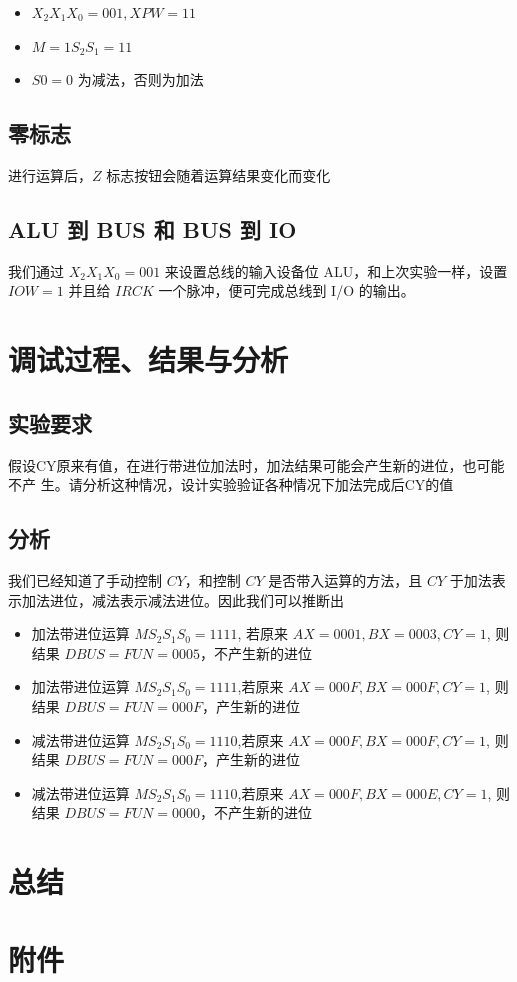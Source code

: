 \documentclass[a4paper,10pt,UTF8]{paper}
\numberwithin{equation}{section}
\numberwithin{figure}{section}
\begin{document}
\begin{itemize}
  \item $X_2X_1X_0=001,XPW=11$
  \item $M=1 S_2S_1=11$
  \item $S0=0$ 为减法，否则为加法
\end{itemize}


\subsection{零标志}

进行运算后，$Z$ 标志按钮会随着运算结果变化而变化

\subsection{ ALU 到 BUS 和 BUS 到 IO}


我们通过 $X_2X_1X_0 = 001$ 来设置总线的输入设备位 ALU，和上次实验一样，设置 $IOW = 1$ 并且给 $IRCK$ 一个脉冲，便可完成总线到 I/O 的输出。


\section{调试过程、结果与分析}

\subsection{实验要求}

假设CY原来有值，在进行带进位加法时，加法结果可能会产生新的进位，也可能不产 生。请分析这种情况，设计实验验证各种情况下加法完成后CY的值

\subsection{分析}

我们已经知道了手动控制 $CY$，和控制 $CY$ 是否带入运算的方法，且 $CY$ 于加法表示加法进位，减法表示减法进位。因此我们可以推断出

\begin{itemize}
  \item 加法带进位运算 $MS_2S_1S_0=1111$, 若原来 $AX=0001,BX=0003,CY=1$, 则结果 $DBUS=FUN=0005$，不产生新的进位
  \item 加法带进位运算 $MS_2S_1S_0=1111$,若原来 $AX=000F,BX=000F,CY=1$, 则结果 $DBUS=FUN=000F$，产生新的进位
  \item 减法带进位运算 $MS_2S_1S_0=1110$,若原来 $AX=000F,BX=000F,CY=1$, 则结果 $DBUS=FUN=000F$，产生新的进位
  \item 减法带进位运算 $MS_2S_1S_0=1110$,若原来 $AX=000F,BX=000E,CY=1$, 则结果 $DBUS=FUN=0000$，不产生新的进位
\end{itemize}

\section{总结}

\section{附件}
\end{document}
